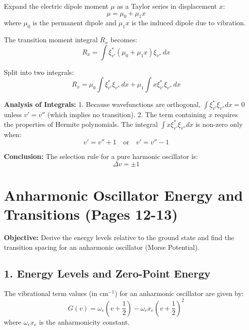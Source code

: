 \documentclass{book}
\begin{document}
Expand the electric dipole moment $\mu$ as a Taylor series in displacement $x$:
\begin{equation}
    \mu = \mu_0 + \mu_1 x
\end{equation}
where $\mu_0$ is the permanent dipole and $\mu_1 x$ is the induced dipole due to vibration. %

The transition moment integral $R_x$ becomes:
\begin{equation}
    R_x = \int \xi_{v'}^* (\mu_0 + \mu_1 x) \xi_{v''} \, dx
\end{equation}

Split into two integrals:
\begin{equation}
    R_x = \mu_0 \int \xi_{v'}^* \xi_{v''} \, dx + \mu_1 \int x \xi_{v'}^* \xi_{v''} \, dx
\end{equation}

\textbf{Analysis of Integrals:}
1. Because wavefunctions are orthogonal, $\int \xi_{v'}^* \xi_{v''} dx = 0$ unless $v' = v''$ (which implies no transition). %
2. The term containing $x$ requires the properties of Hermite polynomials. The integral $\int x \xi_{v'}^* \xi_{v''} dx$ is non-zero only when: %
\begin{equation}
    v' = v'' + 1 \quad \text{or} \quad v' = v'' - 1
\end{equation}

\textbf{Conclusion:} The selection rule for a pure harmonic oscillator is:
\begin{equation}
    \Delta v = \pm 1
\end{equation}

\section*{Anharmonic Oscillator Energy and Transitions (Pages 12-13)}

\textbf{Objective:} Derive the energy levels relative to the ground state and find the transition spacing for an anharmonic oscillator (Morse Potential). %

\subsection*{1. Energy Levels and Zero-Point Energy}
The vibrational term values (in cm$^{-1}$) for an anharmonic oscillator are given by: %
\begin{equation}
    G(v) = \omega_e \left( v + \frac{1}{2} \right) - \omega_e x_e \left( v + \frac{1}{2} \right)^2
\end{equation}
%
where $\omega_e x_e$ is the anharmonicity constant. %
\end{document}

